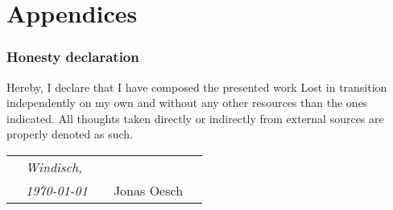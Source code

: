\newpage
\appendix
\part{Appendices}

\section{Honesty declaration}
Hereby, I declare that I have composed the presented work Lost in transition independently on my own and without any other resources than the ones indicated. All thoughts taken directly or indirectly from external sources are properly denoted as such.
\vspace{3cm}

\centering
\begin{tabular}{p{10mm}>{\centering\arraybackslash}p{50mm}p{10mm}
>{\centering\arraybackslash}p{50mm}p{10mm}}
&\textit{\large Windisch,}&&& \\
&\textit{\large  \today}&&\large Jonas Oesch& 
\end{tabular}
\\

